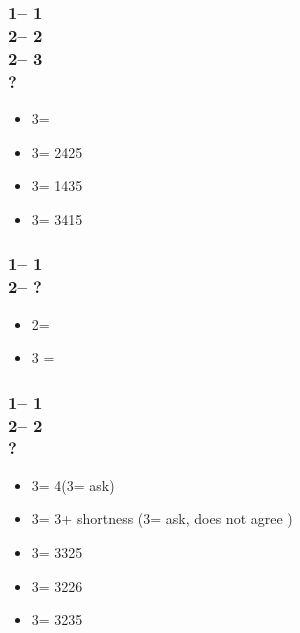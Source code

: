 \documentclass[12pt, a4paper]{report}
\begin{document}
{{{            \subsubsection*{1\clubs -- 1\hearts\\
                            2\hearts -- 2\spades\\
                            2\nt -- 3\clubs\\
                            ?}
            \begin{itemize}
                \item 3\diams = \bal
                \item 3\hearts = 2425
                \item 3\spades = 1435
                \item 3\nt = 3415
            \end{itemize}

            \subsubsection*{1\clubs -- 1\spades\\
                            2\spades -- ?}
            \begin{itemize}
                \item 2\nt = \gf
                \item 3 = \inv
            \end{itemize}

            \subsubsection*{1\clubs -- 1\spades\\
                            2\spades -- 2\nt\\
                            ?}
            \begin{itemize}
                \item 3\clubs = 4\spades (3\diams = ask)
                \item 3\diams = 3\spades + shortness (3\hearts = ask, does not agree \spades)
                \item 3\hearts = 3325
                \item 3\spades = 3226
                \item 3\nt = 3235
            \end{itemize}

}}}
\end{document}
